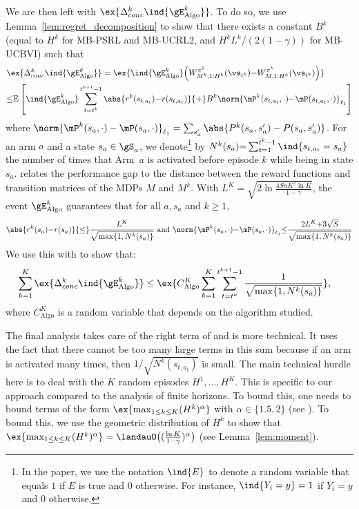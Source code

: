 \begin{subappendices}
We are then left with $\ex{\Delta_{conc}^k \ind{\gE^{k}_\text{Algo}}}$. To do so, we use Lemma~\ref{lem:regret_decomposition} to show that there exists a constant $B^k$ (equal to $H^k$ for MB-PSRL and MB-UCRL2, and $H^kL^{k}/(2(1-\gamma))$ for MB-UCBVI) such that 
\begin{align}
    &\ex{\Delta_{conc}^k\ind{\gE^{k}_\text{Algo}}}=\ex{\ind{\gE^{k}_\text{Algo}} \Big(W_{M^k,1:H^k}^{\pi^k}(\vs_{t^k}){-}W_{M,1:H^k}^{\pi^k}(\vs_{t^k})\Big)} \nonumber\\
    & {\le} \mathbb{E}\left[\ind{\gE^{k}_\text{Algo}} \sum_{t=t^k}^{t^{k+1}{-}1}\abs{r^k(s_{t,a_t}){-}r(s_{t,a_t})}{+}B^k\norm{\mP^{k}(s_{t,a_t},\cdot){-}\mP(s_{t,a_t},\cdot)}_{\ell_1}\right] \label{eq:proof2}
\end{align}
where ${\norm{\mP^{k}(s_a,\cdot)-\mP(s_a,\cdot)}_{\ell_1}=\sum_{s'_a}\abs{P^{k}(s_a,s'_a)-P(s_a,s'_a)}}$. 
For an arm $a$ and a state $s_a\in\gS_a$, we denote\footnote{In the paper, we use the notation $\ind{E}$ to denote a random variable that equals $1$ if $E$ is true and $0$ otherwise. For instance, $\ind{Y_i=y}=1$ if $Y_i=y$ and $0$ otherwise.} by $N^{k}(s_a){=} \sum_{t=1}^{t^{k}-1} \ind{s_{t,a_t}=s_a}$ the number of times that Arm~$a$ is activated before episode $k$ while being in state $s_a$.  relates the performance gap to the distance between the reward functions and transition matrices of the MDPs $M$ and $M^k$. 
With $L^K{=}\sqrt{2\ln\frac{4SnK^2\ln K}{1-\gamma}}$, the event $\gE^{k}_\text{Algo}$ guarantees that for all $a, s_a$ and $ k\ge1$, 
\begin{align}
    \label{eq:concentration}
    \abs{r^k(s_a){-}r(s_a)} {\le} \frac{L^K}{\sqrt{\max\{1,N^{k}(s_a)\}}} \text{ and }
    \norm{\mP^{k}(s_a,\cdot){-}\mP(s_a,\cdot)}_{\ell_1} {\le} \frac{2L^K {+}3\sqrt{S}}{\sqrt{\max\{1,N^{k}(s_a)\}}}
\end{align}
We use this with  to show that:
\begin{align}
    \label{eq:proof3}
    \sum_{k=1}^K\ex{\Delta_{conc}^k \ind{\gE_\text{Algo}^{k}}} &\le  \ex{C_\text{Algo}^K\sum_{k=1}^K\sum_{t=t^k}^{t^{k+1}-1}\frac{1}{\sqrt{\max\{1,N^{k}(s_a)\}}}},
\end{align}
where $C_\text{Algo}^K$ is a random variable that depends on the algorithm studied. 

The final analysis takes care of the right term of  and is more technical. It uses the fact that there cannot be too many large terms in this sum because if an arm is activated many times, then $1/\sqrt{N^{k}(s_{t,a_t})}$ is small. 
The main technical hurdle here is to deal with the $K$ random episodes $H^1,\ldots, H^K$. 
This is specific to our approach compared to the analysis of finite horizons. 
To bound this, one needs to bound terms of the form $\ex{\max_{1\leq k\leq K} (H^k)^\alpha}$ with $\alpha\in\{1.5,2\}$ (see ). 
To bound this, we use the geometric distribution of $H^k$ to show that $\ex{\max_{1\leq k\leq K} (H^k)^{\alpha}}=\landauO\bigl((\frac{\ln K}{1-\gamma})^{\alpha}\bigr)$ (see Lemma~\ref{lem:moment}).


\end{subappendices}
